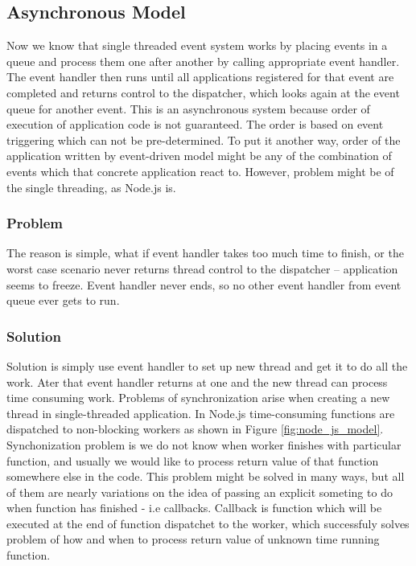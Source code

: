 \subsection{Asynchronous Model} %
\label{sub:asynchronous_code}
Now we know that single threaded event system works by placing events in a queue and process them one after another by calling appropriate event handler. The event handler then runs until all applications registered for that event are completed and returns control to the dispatcher, which looks again at the event queue for another event. This is an asynchronous system because order of execution of application code is not guaranteed. The order is based on event triggering which can not be pre-determined. To put it another way, order of the application written by event-driven model might be any of the combination of events which that concrete application react to. However, problem might be of the single threading, as Node.js is.
\subsubsection{Problem} %
\label{ssub:problem}
The reason is simple, what if event handler takes too much time to finish, or the worst case scenario never returns thread control to the dispatcher -- application seems to freeze. Event handler never ends, so no other event handler from event queue ever gets to run.
\subsubsection{Solution} %
\label{ssub:solution}
Solution is simply use event handler to set up new thread and get it to do all the work. Ater that event handler returns at one and the new thread can process time consuming work. Problems of synchronization arise when creating a new thread in single-threaded application. In Node.js time-consuming functions are dispatched to non-blocking workers as shown in Figure \ref{fig:node_js_model}. Synchonization problem is we do not know when worker finishes with particular function, and usually we would like to process return value of that function somewhere else in the code. This problem might be solved in many ways, but all of them are nearly variations on the idea of passing an explicit someting to do when function has finished - i.e callbacks. Callback is function which will be executed at the end of function dispatchet to the worker, which successfuly solves problem of how and when to process return value of unknown time running function.\cite{asynch}




